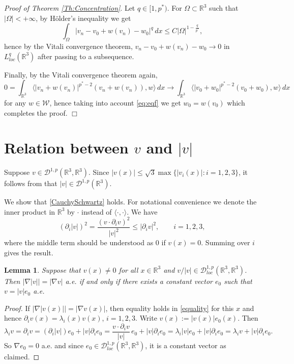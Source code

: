 \documentclass[12pt,leqno,twoside]{amsart}
\newtheorem{Lem}[Th]{Lemma}
\newenvironment{altproof}[1]
{\noindent%
{\em Proof of {#1}}.}
{\nopagebreak\mbox{}\hfill $\Box$\par\addvspace{0.5cm}}
\def\R{\mathbb{R}}
\newcommand{\cD}{{\mathcal D}}
\newcommand{\cDp}{\cD^{1,p}(\R^3,\R^3)}
\newcommand{\cW}{{\mathcal W}}
\newcommand{\Om}{\Omega}
\def\r{\mathbb{R}}
\def\r3{\mathbb{R}^3}
\numberwithin{equation}{section}
\begin{document}
\begin{altproof}{Theorem \ref{Th:Concentration}}
	Let $q\in [1,p^*)$. For $\Omega\subset \R^3$ such that $|\Omega|<+\infty$, by H\"older's inequality we get
	\begin{equation*}
	\int_{\Om} |v_n-v_0+w(v_n)-w_0|^q\,dx
	\leq C |\Omega|^{1-\frac{q}{p^*}},
	\end{equation*}
	hence by the Vitali convergence theorem, $v_n-v_0+w(v_n)-w_0\to 0$ in $L^q_{loc}(\R^3)$ after passing to a subsequence.
	
	Finally, by  the Vitali convergence theorem again, 
	$$0 = \int_{\R^3}\langle |v_n+w(v_n)|^{p^*-2}(v_n+w(v_n)), w\rangle\,dx\to \int_{\R^3}\langle |v_0+ w_0|^{p^*-2}(v_0+w_0),  w\rangle\,dx$$
	for any $w\in\cW$, hence taking into account \eqref{eq:eqf} we get $w_0=w(v_0)$ which completes the proof.
\end{altproof}


\section{Relation between $v$ and $|v|$} \label{sec:relation}

Suppose $v\in\cDp$. Since $|v(x)|\le \sqrt{3}\max\{|v_i(x)|:i=1,2,3\}$,  it follows from \cite[Theorem 6.17 and Corollary 6.18]{LiebLossBook} that $|v|\in \cD^{1,p}(\r3)$. 

We show that \eqref{CauchySchwartz} holds. For notational convenience we denote the inner product in $\r3$ by $\cdot$ instead of $\langle\cdot,\cdot\rangle$.  We have 
\begin{equation} \label{cs}
(\partial_i|v|)^2 = \frac{(v\cdot \partial_iv)^2}{|v|^2} \le |\partial_iv|^2, \qquad i=1,2,3,
\end{equation}
where the middle term should be understood as $0$ if $v(x)=0$. Summing over $i$ gives the result. 

\begin{Lem} \label{equality}
Suppose that $v(x)\neq 0$ for all $x\in\R^3$ and $v/|v|\in \cD_{loc}^{1,p}(\r3,\r3)$. Then $\left|\nabla|v|\right| = |\nabla v|$ a.e. if and only if there exists a constant vector $e_0$ such that $v=|v|e_0$ a.e.
\end{Lem}

\begin{proof}
If $\left|\nabla|v(x)|\right| = |\nabla v(x)|$, then equality holds in \eqref{equality} for this $x$ and hence $\partial_ iv(x)=\lambda_i(x)v(x)$, $i=1,2,3$. Write $v(x) := |v(x)|e_0(x)$. Then
\[
\lambda_iv = \partial_iv = (\partial_i|v|)e_0 + |v|\partial_ie_0 = \frac{v\cdot\partial_iv}{|v|}\,e_0 + |v|\partial_i e_0 = \lambda_i|v|e_0 + |v|\partial_ie_0 = \lambda_iv + |v|\partial_ie_0.
\]
So $\nabla e_0 = 0$ a.e. and since $e_0\in\cD_{loc}^{1,p}(\r3,\r3)$, it is a constant vector as claimed.
\end{proof}
\end{document}
